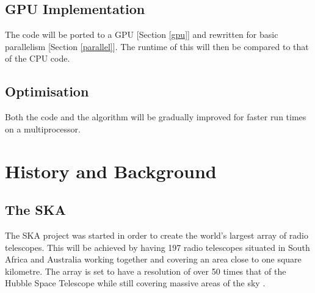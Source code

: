 \subsection{GPU Implementation}
The code will be ported to a GPU [Section \ref{gpu}] and rewritten for basic parallelism [Section \ref{parallel}]. The runtime of this will then be compared to that of the CPU code.
\subsection{Optimisation}
Both the code and the algorithm will be gradually improved for faster run times on a multiprocessor.
\newpage
\section{History and Background}
\subsection{The SKA}\label{ska}
The SKA project was started in order to create the world's largest array of radio telescopes. This will be achieved by having 197 radio telescopes situated in South Africa and Australia working together and covering an area close to one square kilometre. The array is set to have a resolution of over 50 times that of the Hubble Space Telescope while still covering massive areas of the sky \cite{SKAsite}.
